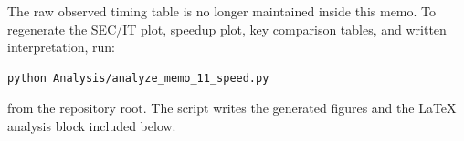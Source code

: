 \documentclass[11pt]{article}
\begin{document}
The raw observed timing table is no longer maintained inside this memo.  To
regenerate the SEC/IT plot, speedup plot, key comparison tables, and written
interpretation, run:
\begin{verbatim}
python Analysis/analyze_memo_11_speed.py
\end{verbatim}
from the repository root.  The script writes the generated figures and the
LaTeX analysis block included below.

\end{document}
